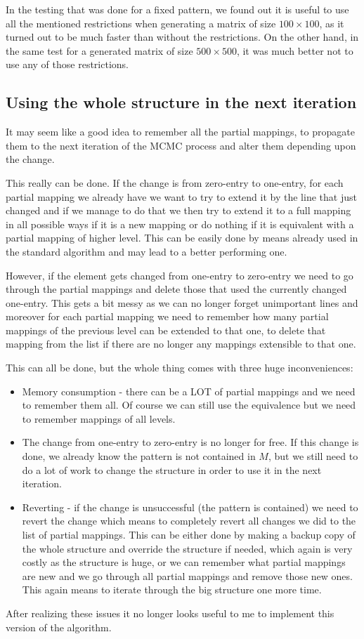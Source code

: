 In the testing that was done for a fixed pattern, we found out it is useful to use all the mentioned restrictions when generating a matrix of size $100\times100$, as it turned out to be much faster than without the restrictions. On the other hand, in the same test for a generated matrix of size $500\times500$, it was much better not to use any of those restrictions.

\subsection{Using the whole structure in the next iteration}
It may seem like a good idea to remember all the partial mappings, to propagate them to the next iteration of the MCMC process and alter them depending upon the change.

This really can be done. If the change is from zero-entry to one-entry, for each partial mapping we already have we want to try to extend it by the line that just changed and if we manage to do that we then try to extend it to a full mapping in all possible ways if it is a new mapping or do nothing if it is equivalent with a partial mapping of higher level. This can be easily done by means already used in the standard algorithm and may lead to a better performing one.

However, if the element gets changed from one-entry to zero-entry we need to go through the partial mappings and delete those that used the currently changed one-entry. This gets a bit messy as we can no longer forget unimportant lines and moreover for each partial mapping we need to remember how many partial mappings of the previous level can be extended to that one, to delete that mapping from the list if there are no longer any mappings extensible to that one.

This can all be done, but the whole thing comes with three huge inconveniences:
\begin{itemize}
\item Memory consumption - there can be a LOT of partial mappings and we need to remember them all. Of course we can still use the equivalence but we need to remember mappings of all levels.
\item The change from one-entry to zero-entry is no longer for free. If this change is done, we already know the pattern is not contained in $M$, but we still need to do a lot of work to change the structure in order to use it in the next iteration.
\item Reverting - if the change is unsuccessful (the pattern is contained) we need to revert the change which means to completely revert all changes we did to the list of partial mappings. This can be either done by making a backup copy of the whole structure and override the structure if needed, which again is very costly as the structure is huge, or we can remember what partial mappings are new and we go through all partial mappings and remove those new ones. This again means to iterate through the big structure one more time.
\end{itemize}
After realizing these issues it no longer looks useful to me to implement this version of the algorithm.

